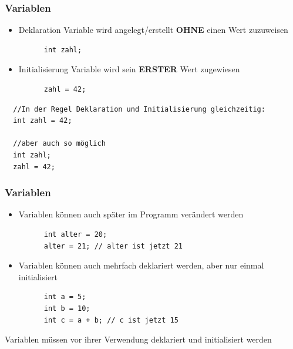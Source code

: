 \documentclass{../../presentation}
\begin{document}
\begin{frame}[fragile]
  \frametitle{Variablen}
  \begin{itemize}
    \item Deklaration \quad \textrightarrow \quad Variable wird angelegt/erstellt \textbf{OHNE} einen Wert zuzuweisen
          \begin{verbatim}
      int zahl;
    \end{verbatim}
          \pause
    \item Initialisierung \quad \textrightarrow \quad Variable wird sein \textbf{ERSTER} Wert zugewiesen
          \begin{verbatim}
      zahl = 42;
    \end{verbatim}
          \pause
  \end{itemize}
  \begin{verbatim}
  //In der Regel Deklaration und Initialisierung gleichzeitig:
  int zahl = 42;

  //aber auch so möglich
  int zahl;
  zahl = 42;
  \end{verbatim}
\end{frame}

\begin{frame}[fragile]
  \frametitle{Variablen}
  \begin{itemize}
    \item Variablen können auch später im Programm verändert werden
          \begin{verbatim}
      int alter = 20;
      alter = 21; // alter ist jetzt 21
    \end{verbatim}
    \item Variablen können auch mehrfach deklariert werden, aber nur einmal initialisiert
          \begin{verbatim}
      int a = 5;
      int b = 10;
      int c = a + b; // c ist jetzt 15
    \end{verbatim}
  \end{itemize}
  \achtung{} Variablen müssen vor ihrer Verwendung deklariert und initialisiert werden
\end{frame}

\end{document}
